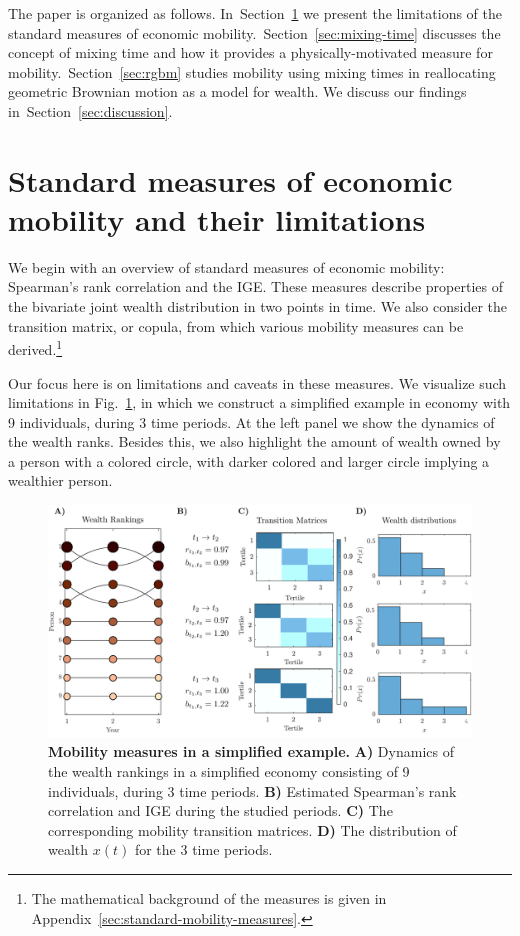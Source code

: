\documentclass[11pt]{article}
\newcommand{\Sref}[1]{Section~\ref{sec:#1}}
\newcommand{\fref}[1]{Fig.~\ref{fig:#1}}
\numberwithin{equation}{section}
\begin{document}
The paper is organized as follows. In~\Sref{standard-measures} we present the limitations of the standard measures of economic mobility.~\Sref{mixing-time} discusses the concept of mixing time and how it provides a physically-motivated measure for mobility.~\Sref{rgbm} studies mobility using mixing times in reallocating geometric Brownian motion as a model for wealth. We discuss our findings in~\Sref{discussion}.

\section{Standard measures of economic mobility and their limitations}\label{sec:standard-measures}

We begin with an overview of standard measures of economic mobility: Spearman's rank correlation and the IGE. These measures describe properties of the bivariate joint wealth distribution in two points in time. We also consider the transition matrix, or copula, from which various mobility measures can be derived.\footnote{The mathematical background of the measures is given in Appendix~\ref{sec:standard-mobility-measures}.}

Our focus here is on limitations and caveats in these measures. We visualize such limitations in \fref{standard-mobility-measures}, in which we construct a simplified example in economy with 9 individuals, during 3 time periods. At the left panel we show the dynamics of the wealth ranks. Besides this, we also highlight the amount of wealth owned by a person with a colored circle, with darker colored and larger circle implying a wealthier person.

\begin{figure}[!htb]
\centering
\includegraphics[width=1.0\textwidth]{figs/fig_mobility_measures.pdf}
\caption{\textbf{Mobility measures in a simplified example.} \textbf{A)} Dynamics of the wealth rankings in a simplified economy consisting of 9 individuals, during 3 time periods. \textbf{B)} Estimated Spearman's rank correlation and IGE during the studied periods. \textbf{C)} The corresponding mobility transition matrices. \textbf{D)} The distribution of wealth $x(t)$ for the 3 time periods.
\label{fig:standard-mobility-measures}}
\end{figure}
\end{document}
